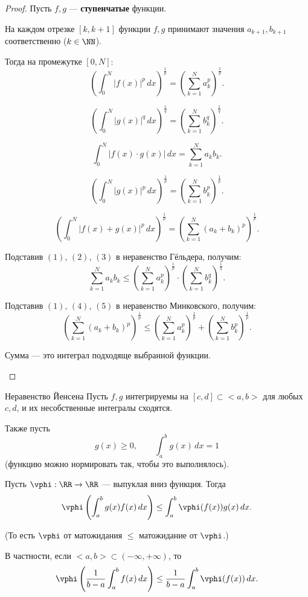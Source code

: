 \begin{proof}
	Пусть $f,g$ --- \textbf{ступенчатые} функции.
	
	На каждом отрезке $[k,k+1]$ функции $f,g$ принимают значения $a_{k+1}, b_{k+1}$ соответственно ($k\in\NN$).
	
	Тогда на промежутке $[0,N]$:
	\begin{equation}
		\left(\int_0^N |f(x)|^p\,dx\right)^{\frac{1}{p}}
		=
		\left(\sum_{k=1}^N a_k^p\right)^{\frac{1}{p}}.
	\end{equation}
	
	\begin{equation}
		\left(\int_0^N |g(x)|^q\,dx\right)^{\frac{1}{q}}
		=
		\left(\sum_{k=1}^N b_k^q\right)^{\frac{1}{q}}.
	\end{equation}
	
	\begin{equation}
		\int_0^N |f(x)\cdot g(x)|\,dx
		=
		\sum_{k=1}^N a_k b_k.
	\end{equation}
	
	\begin{equation}
		\left(\int_0^N |g(x)|^p\,dx\right)^{\frac{1}{p}}
		=
		\left(\sum_{k=1}^N b_k^p\right)^{\frac{1}{p}}.
	\end{equation}
	
	\begin{equation}
		\left(\int_0^N |f(x)+g(x)|^p\,dx\right)^{\frac{1}{p}}
		=
		\left(\sum_{k=1}^N (a_k+b_k)^p\right)^{\frac{1}{p}}.
	\end{equation}
	
	Подставив $(1)$, $(2)$, $(3)$ в неравенство Гёльдера, получим:
	\[
	\sum_{k=1}^N a_k b_k
	\le
	\left(\sum_{k=1}^N a_k^p\right)^{\frac{1}{p}}
	\cdot
	\left(\sum_{k=1}^N b_k^q\right)^{\frac{1}{q}}.
	\]
	
	Подставив $(1)$, $(4)$, $(5)$ в неравенство Минковского, получим:
	\[
	\left(\sum_{k=1}^N (a_k+b_k)^p\right)^{\frac{1}{p}}
	\le
	\left(\sum_{k=1}^N a_k^p\right)^{\frac{1}{p}}
	+
	\left(\sum_{k=1}^N b_k^p\right)^{\frac{1}{p}}.
	\]
	
	\begin{remark}
		Сумма --- это интеграл подходяще выбранной функции.
	\end{remark}
\end{proof}

\begin{Theorem}{Неравенство Йенсена}{}
	Пусть $f,g$ интегрируемы на $[c,d]\subset<a,b>$ для любых $c,d$, и их несобственные интегралы сходятся.
	
	Также пусть
	\[
	g(x)\ge 0,
	\qquad
	\int_a^b g(x)\,dx = 1
	\]
	(функцию можно нормировать так, чтобы это выполнялось).
	
	Пусть $\vphi:\RR\to\RR$ --- выпуклая вниз функция. Тогда
	\[
	\vphi\left(\int_a^b g(x)f(x)\,dx\right)
	\le
	\int_a^b \vphi(f(x))g(x)\,dx.
	\]
	
	(То есть $\vphi$ от матожидания $\le$ матожидание от $\vphi$.)
	
	В частности, если $<a,b>\subset(-\infty,+\infty)$, то
	\[
	\vphi\left(\frac{1}{b-a}\int_a^b f(x)\,dx\right)
	\le
	\frac{1}{b-a}\int_a^b \vphi(f(x))\,dx.
	\]
\end{Theorem}

